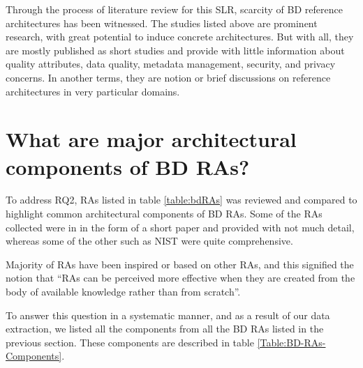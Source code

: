 \documentclass{ieeeaccess}
\begin{document}
Through the process of literature review for this SLR, scarcity of BD reference architectures has been witnessed. The studies listed above are prominent research, with great potential to induce concrete architectures. But with all, they are mostly published as short studies and provide with little information about quality attributes, data quality, metadata management, security, and privacy concerns. In another terms, they are notion or brief discussions on reference architectures in very particular domains.

\section{What are major architectural components of BD RAs? }

To address RQ2, RAs listed in table \ref{table:bdRAs} was reviewed and compared to highlight common architectural components of BD RAs. Some of the RAs collected were in in the form of a short paper and provided with not much detail, whereas some of the other such as NIST were quite comprehensive. 

Majority of RAs have been inspired or based on other RAs, and this signified the notion that “RAs can be perceived more effective when they are created from the body of available knowledge rather than from scratch”.

To answer this question in a systematic manner, and as a result of our data extraction, we listed all the components from all the BD RAs listed in the previous section. These components are described in table \ref{Table:BD-RAs-Components}.
\end{document}
